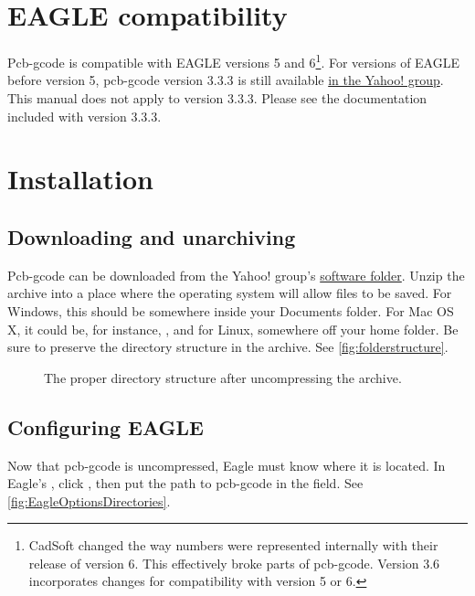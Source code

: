 \documentclass[11pt]{book}
\begin{document}
\section{EAGLE compatibility}\label{sec:EAGLECompatibility}

Pcb-gcode is compatible with EAGLE versions 5 and 6\footnote{CadSoft changed the way numbers were represented internally with their release of version 6. This effectively broke parts of pcb-gcode. Version 3.6 incorporates changes for compatibility with version 5 or 6.}. For versions of EAGLE before version 5, pcb-gcode version 3.3.3 is still available \href{http://groups.yahoo.com/group/pcb-gcode/files/\%21\%20Software/pcb-gcode-3.3.3.zip}{in the Yahoo! group}. This manual does not apply to version 3.3.3. Please see the documentation included with version 3.3.3.

%
%
\section{Installation}\label{sec:Installation}

\subsection{Downloading and unarchiving}
Pcb-gcode can be downloaded from the Yahoo! group's \href{http://groups.yahoo.com/group/pcb-gcode/files/\%21\%20Software}{software folder}.  Unzip the archive into a place where the operating system will allow files to be saved. For Windows, this should be somewhere inside your Documents folder. For Mac OS X, it could be, for instance, , and for Linux, somewhere off your home folder. Be sure to preserve the directory structure in the archive. See \figurename \vref{fig:folderstructure}.

\begin{figure}
	\caption{The proper directory structure after uncompressing the archive.}
	\label{fig:folderstructure}
\end{figure}

\subsection{Configuring EAGLE}
Now that pcb-gcode is uncompressed, Eagle must know where it is located. In Eagle's , click , then put the path to pcb-gcode in the  field. See \figurename \vref{fig:EagleOptionsDirectories}.
\end{document}
